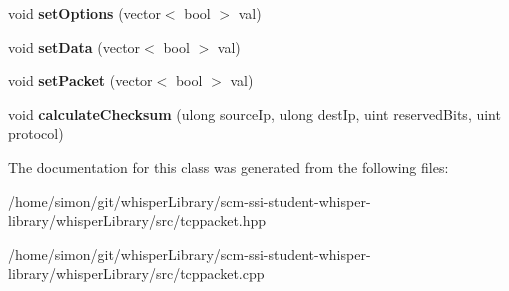 \begin{DoxyCompactItemize}
\item 
\hypertarget{classwhisper__library_1_1TcpPacket_a095139a0c4ec593afa12991e8eb33ee0}{void {\bfseries set\-Options} (vector$<$ bool $>$ val)}\label{classwhisper__library_1_1TcpPacket_a095139a0c4ec593afa12991e8eb33ee0}

\item 
\hypertarget{classwhisper__library_1_1TcpPacket_a969d01e24f894a7f2b99dee210bb6a65}{void {\bfseries set\-Data} (vector$<$ bool $>$ val)}\label{classwhisper__library_1_1TcpPacket_a969d01e24f894a7f2b99dee210bb6a65}

\item 
\hypertarget{classwhisper__library_1_1TcpPacket_a0b0a67dddb600b642b0499c4714981ea}{void {\bfseries set\-Packet} (vector$<$ bool $>$ val)}\label{classwhisper__library_1_1TcpPacket_a0b0a67dddb600b642b0499c4714981ea}

\item 
\hypertarget{classwhisper__library_1_1TcpPacket_a3461c1b760853c1e6c5e859f9a642a6d}{void {\bfseries calculate\-Checksum} (ulong source\-Ip, ulong dest\-Ip, uint reserved\-Bits, uint protocol)}\label{classwhisper__library_1_1TcpPacket_a3461c1b760853c1e6c5e859f9a642a6d}

\end{DoxyCompactItemize}


\-The documentation for this class was generated from the following files\-:\begin{DoxyCompactItemize}
\item 
/home/simon/git/whisper\-Library/scm-\/ssi-\/student-\/whisper-\/library/whisper\-Library/src/tcppacket.\-hpp\item 
/home/simon/git/whisper\-Library/scm-\/ssi-\/student-\/whisper-\/library/whisper\-Library/src/tcppacket.\-cpp\end{DoxyCompactItemize}
